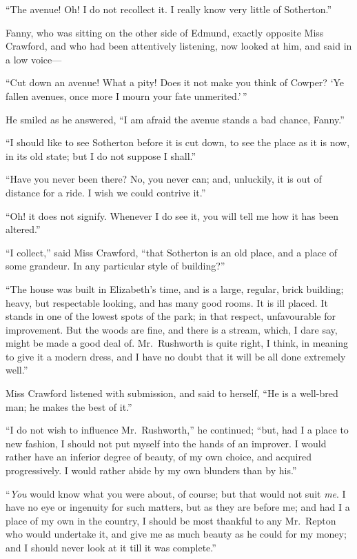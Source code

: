 ``The avenue!  Oh!  I do not recollect it.  I really know
very little of Sotherton.''

Fanny, who was sitting on the other side of Edmund,
exactly opposite Miss Crawford, and who had been attentively
listening, now looked at him, and said in a low voice---%

``Cut down an avenue!  What a pity!  Does it not make you
think of Cowper?  `Ye fallen avenues, once more I mourn
your fate unmerited.'\,''

He smiled as he answered, ``I am afraid the avenue stands
a bad chance, Fanny.''

``I should like to see Sotherton before it is cut down,
to see the place as it is now, in its old state; but I do
not suppose I shall.''

``Have you never been there?  No, you never can;
and, unluckily, it is out of distance for a ride.
I wish we could contrive it.''

``Oh! it does not signify.  Whenever I do see it,
you will tell me how it has been altered.''

``I collect,'' said Miss Crawford, ``that Sotherton
is an old place, and a place of some grandeur.
In any particular style of building?''

``The house was built in Elizabeth's time, and is a large,
regular, brick building; heavy, but respectable looking,
and has many good rooms.  It is ill placed.  It stands
in one of the lowest spots of the park; in that respect,
unfavourable for improvement.  But the woods are fine,
and there is a stream, which, I dare say, might be made
a good deal of.  Mr.\ Rushworth is quite right, I think,
in meaning to give it a modern dress, and I have no doubt
that it will be all done extremely well.''

Miss Crawford listened with submission, and said to herself,
``He is a well-bred man; he makes the best of it.''

``I do not wish to influence Mr.\ Rushworth,'' he continued;
``but, had I a place to new fashion, I should not put
myself into the hands of an improver.  I would rather
have an inferior degree of beauty, of my own choice,
and acquired progressively.  I would rather abide by my own
blunders than by his.''

``\emph{You} would know what you were about, of course;
but that would not suit \emph{me}.  I have no eye or
ingenuity for such matters, but as they are before me;
and had I a place of my own in the country, I should be
most thankful to any Mr.\ Repton who would undertake it,
and give me as much beauty as he could for my money;
and I should never look at it till it was complete.''

